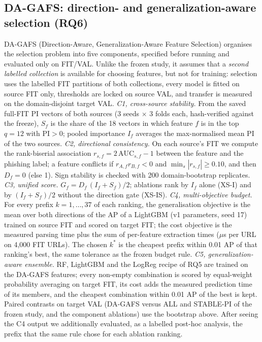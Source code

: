 \subsection{DA-GAFS: direction- and generalization-aware selection (RQ6)}\label{sec:dagafs}
DA-GAFS (Direction-Aware, Generalization-Aware Feature Selection) organises the selection problem into five components, specified before running and evaluated only on FIT/VAL. Unlike the frozen study, it assumes that a \emph{second labelled collection} is available for choosing features, but not for training: selection uses the labelled FIT partitions of both collections, every model is fitted on source FIT only, thresholds are locked on source VAL, and transfer is measured on the domain-disjoint target VAL. \emph{C1, cross-source stability.} From the saved full-FIT PI vectors of both sources (3 seeds $\times$ 3 folds each, hash-verified against the freeze), $S_f$ is the share of the 18 vectors in which feature $f$ is in the top $q{=}12$ with PI${>}0$; pooled importance $I_f$ averages the max-normalised mean PI of the two sources. \emph{C2, directional consistency.} On each source's FIT we compute the rank-biserial association $r_{s,f}=2\,\mathrm{AUC}_{s,f}-1$ between the feature and the phishing label; a feature conflicts if $r_{A,f}r_{B,f}<0$ and $\min_s|r_{s,f}|\ge0.10$, and then $D_f{=}0$ (else 1). Sign stability is checked with 200 domain-bootstrap replicates. \emph{C3, unified score.} $G_f=D_f\,(I_f+S_f)/2$; ablations rank by $I_f$ alone (XS-I) and by $(I_f+S_f)/2$ without the direction gate (XS-IS). \emph{C4, multi-objective budget.} For every prefix $k=1,\dots,37$ of each ranking, the generalisation objective is the mean over both directions of the AP of a LightGBM (v1 parameters, seed 17) trained on source FIT and scored on target FIT; the cost objective is the measured parsing time plus the sum of per-feature extraction times ($\mu$s per URL on 4{,}000 FIT URLs). The chosen $k^*$ is the cheapest prefix within 0.01 AP of that ranking's best, the same tolerance as the frozen budget rule. \emph{C5, generalization-aware ensemble.} RF, LightGBM and the LogReg recipe of RQ5 are trained on the DA-GAFS features; every non-empty combination is scored by equal-weight probability averaging on target FIT, its cost adds the measured prediction time of its members, and the cheapest combination within 0.01 AP of the best is kept. Paired contrasts on target VAL (DA-GAFS versus ALL and STABLE-PI of the frozen study, and the component ablations) use the bootstrap above. After seeing the C4 output we additionally evaluated, as a labelled post-hoc analysis, the prefix that the same rule chose for each ablation ranking.

